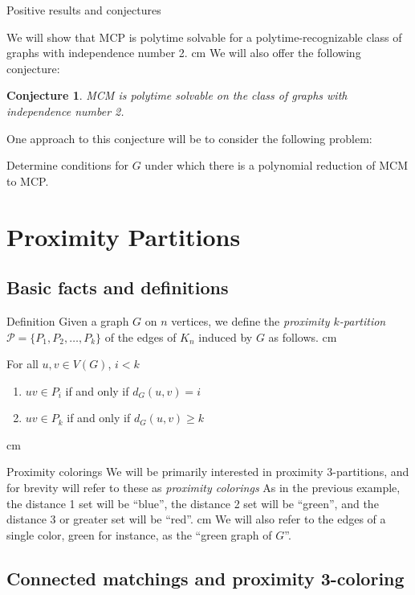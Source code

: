 \documentclass{beamer}
\newtheorem{conjecture}{Conjecture}
\newcommand{\bframe}[2]{\begin{frame}{#1}#2\end{frame}}
\begin{document}
\bframe{Positive results and conjectures}{
	
	We will show that MCP is polytime solvable for a polytime-recognizable class of graphs with independence number 2. \pause\vskip 0.5 cm
	We will also offer the following conjecture:\pause
	\begin{conjecture}
		MCM is polytime solvable on the class of graphs with independence number 2.  
	\end{conjecture}\pause
	One approach to this conjecture will be to consider the following problem:\pause
	\begin{problem}
		Determine conditions for $G$ under which there is a polynomial reduction of MCM to MCP.
	\end{problem}\pause
}

\section{Proximity Partitions}

\subsection{Basic facts and definitions}

\bframe{Definition}{
	Given a graph $G$ on $n$ vertices, we define the \textit{proximity $k$-partition} $\mathcal{P} = \{P_1, P_2, \ldots, P_k\}$ of the edges of $K_n$ induced by $G$ as follows.\pause\vskip 0.5 cm

	For all $u,v \in V(G)$, $i < k$
 	\begin{enumerate}
  		\item $uv \in P_i$ if and only if $d_G(u,v) = i$\pause
  		\item $uv \in P_k$ if and only if $d_G(u,v) \geq k$\pause
 	\end{enumerate}
	 cm
	\begin{center}\pause\quad \end{center}}

\bframe{Proximity colorings}{
	We will be primarily interested in proximity 3-partitions, and for brevity will refer to these as \textit{proximity colorings}\pause\vskip 0.5cm
	As in the previous example, the distance 1 set will be ``blue'', the distance 2 set will be ``green'', and the distance 3 or greater set will be ``red''.\pause\vskip 0.5 cm
	We will also refer to the edges of a single color, green for instance, as the ``green graph of $G$''.}

\subsection{Connected matchings and proximity 3-coloring}
\end{document}
